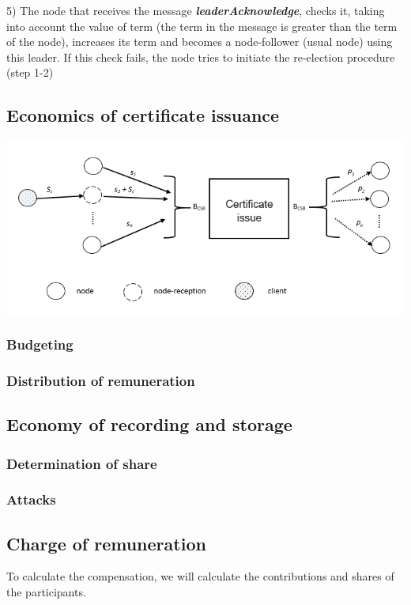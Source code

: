 \documentclass[12pt, a5paper]{article}
\begin{document}
5) The node that receives the message \textbf{\textit{leaderAcknowledge}}, checks it, taking into account the value of term (the term in the message is greater than the term of the node), increases its term and becomes a node-follower (usual node)  using this leader.
If this check fails, the node tries to initiate the re-election procedure (step 1-2)

\subsection{Economics of certificate issuance}

\includegraphics[scale=0.5]{3.png}

\subsubsection{Budgeting}
\subsubsection{Distribution of remuneration}
\subsection{Economy of recording and storage}
\subsubsection{Determination of share}
\subsubsection{Attacks}
\subsection{Charge of remuneration}

To calculate the compensation, we will calculate the contributions and shares of the participants.
\end{document}
